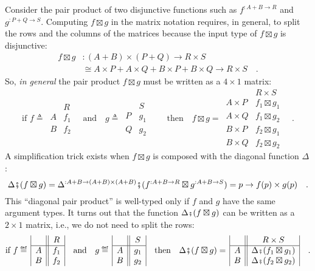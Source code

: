Consider the pair product of two disjunctive functions such as $f^{:A+B\rightarrow R}$
and $g^{:P+Q\rightarrow S}$. Computing $f\boxtimes g$ in the matrix
notation requires, in general, to split the rows and the columns of
the matrices because the input type of $f\boxtimes g$ is disjunctive:
\begin{align*}
f\boxtimes g & :(A+B)\times(P+Q)\rightarrow R\times S\\
 & \cong A\times P+A\times Q+B\times P+B\times Q\rightarrow R\times S\quad.
\end{align*}
So, \emph{in general} the pair product $f\boxtimes g$ must be written
as a $4\times1$ matrix:
\[
\text{if }f\triangleq\,\begin{array}{|c||c|}
 & R\\
\hline A & f_{1}\\
B & f_{2}
\end{array}\quad\text{and}\quad g\triangleq\,\begin{array}{|c||c|}
 & S\\
\hline P & g_{1}\\
Q & g_{2}
\end{array}\quad\quad\text{then}\quad f\boxtimes g=\,\begin{array}{|c||c|}
 & R\times S\\
\hline A\times P & f_{1}\boxtimes g_{1}\\
A\times Q & f_{1}\boxtimes g_{2}\\
B\times P & f_{2}\boxtimes g_{1}\\
B\times Q & f_{2}\boxtimes g_{2}
\end{array}\quad.
\]
A simplification trick exists when $f\boxtimes g$ is composed with
the diagonal function $\Delta$:
\[
\Delta\bef(f\boxtimes g)=\Delta^{:A+B\rightarrow(A+B)\times(A+B)}\bef(f^{:A+B\rightarrow R}\boxtimes g^{:A+B\rightarrow S})=p\rightarrow f(p)\times g(p)\quad.
\]
This \textsf{``}diagonal pair product\textsf{''} is well-typed only if $f$ and $g$
have the same argument types. It turns out that the function $\Delta\bef(f\boxtimes g)$
can be written as a $2\times1$ matrix, i.e., we do not need to split
the rows:
\[
\text{if }f\triangleq\,\begin{array}{|c||c|}
 & R\\
\hline A & f_{1}\\
B & f_{2}
\end{array}\quad\text{and}\quad g\triangleq\,\begin{array}{|c||c|}
 & S\\
\hline A & g_{1}\\
B & g_{2}
\end{array}\quad\text{then}\quad\Delta\bef(f\boxtimes g)=\,\begin{array}{|c||c|}
 & R\times S\\
\hline A & \Delta\bef(f_{1}\boxtimes g_{1})\\
B & \Delta\bef(f_{2}\boxtimes g_{2})
\end{array}\quad.
\]

